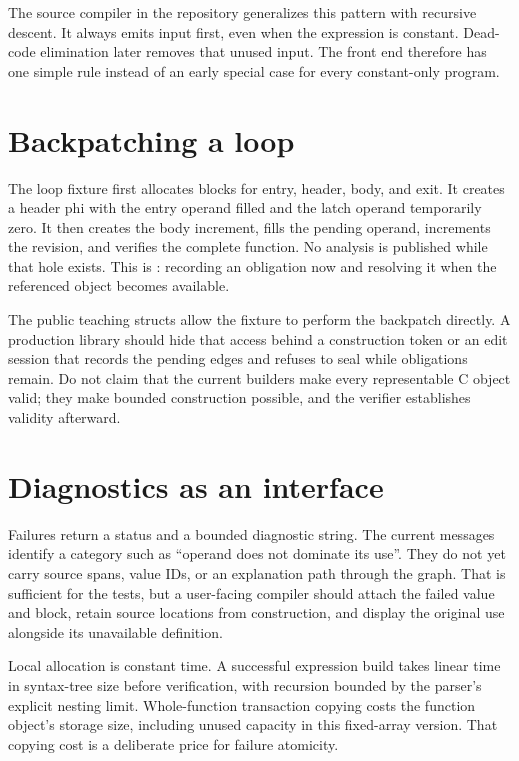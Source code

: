 The source compiler in the repository generalizes this pattern with recursive descent.
It always emits input first, even when the expression is constant.
Dead-code elimination later removes that unused input.
The front end therefore has one simple rule instead of an early special case for every constant-only program.

\section{Backpatching a loop}
\label{sec:pebble-backpatch}
The loop fixture first allocates blocks for entry, header, body, and exit.
It creates a header phi with the entry operand filled and the latch operand temporarily zero.
It then creates the body increment, fills the pending operand, increments the revision, and verifies the complete function.
No analysis is published while that hole exists.
This is : recording an obligation now and resolving it when the referenced object becomes available.

The public teaching structs allow the fixture to perform the backpatch directly.
A production library should hide that access behind a construction token or an edit session that records the pending edges and refuses to seal while obligations remain.
Do not claim that the current builders make every representable C object valid; they make bounded construction possible, and the verifier establishes validity afterward.

\section{Diagnostics as an interface}
\label{sec:pebble-diagnostics}
Failures return a status and a bounded diagnostic string.
The current messages identify a category such as \enquote{operand does not dominate its use}.
They do not yet carry source spans, value IDs, or an explanation path through the graph.
That is sufficient for the tests, but a user-facing compiler should attach the failed value and block, retain source locations from construction, and display the original use alongside its unavailable definition.

Local allocation is constant time.
A successful expression build takes linear time in syntax-tree size before verification, with recursion bounded by the parser's explicit nesting limit.
Whole-function transaction copying costs the function object's storage size, including unused capacity in this fixed-array version.
That copying cost is a deliberate price for failure atomicity.

